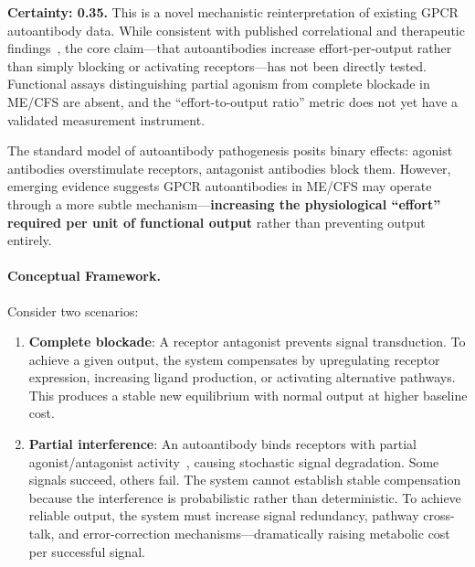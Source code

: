 \begin{speculation}
\label{spec:autoantibody-inefficiency}

\textbf{Certainty: 0.35.} This is a novel mechanistic reinterpretation of existing GPCR autoantibody data. While consistent with published correlational and therapeutic findings~\cite{Sotzny2021,Stein2024immunoadsorption,Hackel2025monocyte}, the core claim---that autoantibodies increase effort-per-output rather than simply blocking or activating receptors---has not been directly tested. Functional assays distinguishing partial agonism from complete blockade in ME/CFS are absent, and the ``effort-to-output ratio'' metric does not yet have a validated measurement instrument.

The standard model of autoantibody pathogenesis posits binary effects: agonist antibodies overstimulate receptors, antagonist antibodies block them. However, emerging evidence suggests GPCR autoantibodies in ME/CFS may operate through a more subtle mechanism---\textbf{increasing the physiological ``effort'' required per unit of functional output} rather than preventing output entirely.

\paragraph{Conceptual Framework.}

Consider two scenarios:
\begin{enumerate}
    \item \textbf{Complete blockade}: A receptor antagonist prevents signal transduction. To achieve a given output, the system compensates by upregulating receptor expression, increasing ligand production, or activating alternative pathways. This produces a stable new equilibrium with normal output at higher baseline cost.

    \item \textbf{Partial interference}: An autoantibody binds receptors with partial agonist/antagonist activity~\cite{Wallukat2021gpcr_mechanisms}, causing stochastic signal degradation. Some signals succeed, others fail. The system cannot establish stable compensation because the interference is probabilistic rather than deterministic. To achieve reliable output, the system must increase signal redundancy, pathway cross-talk, and error-correction mechanisms---dramatically raising metabolic cost per successful signal.
\end{enumerate}


\end{speculation}
